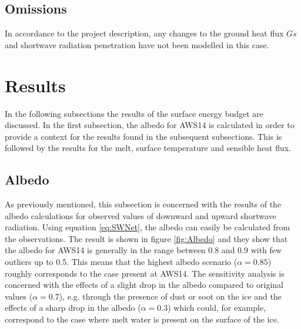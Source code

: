 \documentclass{article}
\begin{document}
\subsection*{Omissions}
In accordance to the project description, any changes to the ground heat flux $Gs$ and shortwave radiation penetration have not been modelled in this case. 









\section*{Results}
In the following subsections the results of the surface energy budget are discussed. 
In the first subsection, the albedo for AWS14 is calculated in order to provide a context for the results found in the subsequent subsections. 
This is followed by the results for the melt, surface temperature and sensible heat flux. 


\subsection*{Albedo}
As previously mentioned, this subsection is concerned with the results of the albedo calculations for observed values of downward and upward shortwave radiation.
Using equation \eqref{eq:SWNet}, the albedo can easily be calculated from the observations. 
The result is shown in figure \ref{fig:Albedo} and they show that the albedo for AWS14 is generally in the range between 0.8 and 0.9 with few outliers up to 0.5. 
This means that the highest albedo scenario ($\alpha = 0.85$) roughly corresponds to the case present at AWS14. 
The sensitivity analysis is concerned with the effects of a slight drop in the albedo compared to original values ($\alpha = 0.7$), e.g. through the presence of dust or soot on the ice and the effects of a sharp drop in the albedo ($\alpha = 0.3$) which could, for example, correspond to the case where melt water is present on the surface of the ice.
\end{document}
